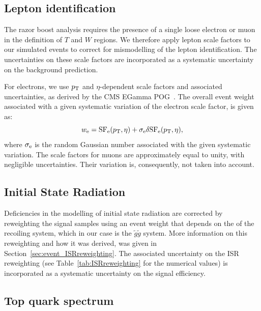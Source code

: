 \subsection{Lepton identification \label{sec:boost_leptonID}} 

The razor boost analysis requires the presence of a single loose electron or muon in the definition
of $T$ and $W$ regions. We therefore apply lepton scale factors to our simulated events to correct
for mismodelling of the lepton identification. The uncertainties on these scale factors are
incorporated as a systematic uncertainty on the background prediction.  

For electrons, we use $p_{\mathrm{T}}$ and $\eta$-dependent scale factors and associated uncertainties, as
derived by the CMS EGamma POG~\cite{ElectronSF}.
The overall event weight associated with a given systematic variation of the electron scale
factor, is given as:
\begin{equation}
w_{\rm e} = {\rm SF_{e}}(p_{\mathrm{T}}, \eta) + \sigma_{\rm e} \delta {\rm SF_{e}}(p_{\mathrm{T}}, \eta), 
\end{equation}
where $\sigma_{\rm e}$ is the random Gaussian number associated with the given systematic variation.
The scale factors for muons are approximately equal to unity, with negligible uncertainties. Their
variation is, consequently, not taken into account.

\subsection{Initial State Radiation} 

Deficiencies in the modelling of initial state radiation are corrected by reweighting the
signal samples using an event weight that depends on the \pt of the recoiling system, which in our
case is the $\tilde{g}\tilde{g}$ system. 
More information on this reweighting and how it was derived, was given in
Section~\ref{sec:event_ISRreweighting}. 
The associated uncertainty on the ISR reweighting (see Table~\ref{tab:ISRreweighting} for the
numerical values) is incorporated as a systematic uncertainty on the signal efficiency. 

\subsection{Top quark \texorpdfstring{\pt}{pT} spectrum} 

